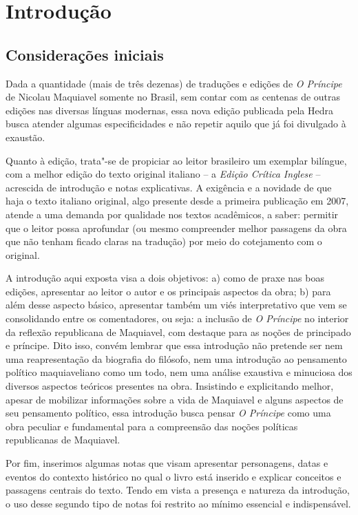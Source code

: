 \chapter*{Introdução}

\section{Considerações iniciais}

Dada a quantidade (mais de três dezenas) de traduções e edições de
\emph{O Príncipe} de Nicolau Maquiavel somente no Brasil, sem contar com
as centenas de outras edições nas diversas línguas modernas, essa nova
edição publicada pela Hedra busca atender algumas especificidades e não
repetir aquilo que já foi divulgado à exaustão.

Quanto à edição, trata"-se de propiciar ao leitor brasileiro um exemplar
bilíngue, com a melhor edição do texto original italiano -- a
\emph{Edição Crítica Inglese} -- acrescida de introdução e notas
explicativas. A exigência e a novidade de que haja o texto italiano
original, algo presente desde a primeira publicação em 2007, atende a
uma demanda por qualidade nos textos acadêmicos, a saber: permitir que o
leitor possa aprofundar (ou mesmo compreender melhor passagens da obra
que não tenham ficado claras na tradução) por meio do cotejamento com o
original.

A introdução aqui exposta visa a dois objetivos: a) como de praxe nas
boas edições, apresentar ao leitor o autor e os principais aspectos da
obra; b) para além desse aspecto básico, apresentar também um viés
interpretativo que vem se consolidando entre os comentadores, ou seja: a
inclusão de \emph{O Príncipe} no interior da reflexão republicana de
Maquiavel, com destaque para as noções de principado e príncipe. Dito
isso, convém lembrar que essa introdução não pretende ser nem uma
reapresentação da biografia do filósofo, nem uma introdução ao
pensamento político maquiaveliano como um todo, nem uma análise
exaustiva e minuciosa dos diversos aspectos teóricos presentes na obra.
Insistindo e explicitando melhor, apesar de mobilizar informações sobre
a vida de Maquiavel e alguns aspectos de seu pensamento político, essa
introdução busca pensar \emph{O Príncipe} como uma obra peculiar e
fundamental para a compreensão das noções políticas republicanas de
Maquiavel.

Por fim, inserimos algumas notas que visam apresentar personagens, datas
e eventos do contexto histórico no qual o livro está inserido e explicar
conceitos e passagens centrais do texto. Tendo em vista a presença e
natureza da introdução, o uso desse segundo tipo de notas foi restrito
ao mínimo essencial e indispensável.

